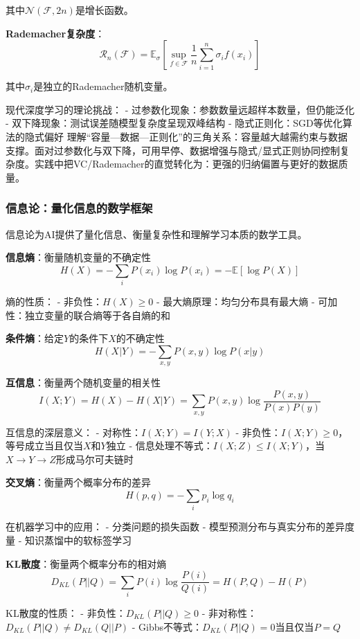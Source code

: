 其中$\mathcal{N}(\mathcal{F}, 2n)$是增长函数。

\textbf{Rademacher复杂度}：
$$\mathcal{R}_n(\mathcal{F}) = \mathbb{E}_{\sigma}\left[\sup_{f \in \mathcal{F}} \frac{1}{n}\sum_{i=1}^n \sigma_i f(x_i)\right]$$

其中$\sigma_i$是独立的Rademacher随机变量。

现代深度学习的理论挑战：
- 过参数化现象：参数数量远超样本数量，但仍能泛化
- 双下降现象：测试误差随模型复杂度呈现双峰结构
- 隐式正则化：SGD等优化算法的隐式偏好
理解“容量—数据—正则化”的三角关系：容量越大越需约束与数据支撑。面对过参数化与双下降，可用早停、数据增强与隐式/显式正则协同控制复杂度。实践中把VC/Rademacher的直觉转化为：更强的归纳偏置与更好的数据质量。

\subsubsection{信息论：量化信息的数学框架}

信息论为AI提供了量化信息、衡量复杂性和理解学习本质的数学工具。

\textbf{信息熵}：衡量随机变量的不确定性
$$H(X) = -\sum_{i} P(x_i) \log P(x_i) = -\mathbb{E}[\log P(X)]$$

熵的性质：
- 非负性：$H(X) \geq 0$
- 最大熵原理：均匀分布具有最大熵
- 可加性：独立变量的联合熵等于各自熵的和

\textbf{条件熵}：给定$Y$的条件下$X$的不确定性
$$H(X|Y) = -\sum_{x,y} P(x,y) \log P(x|y)$$

\textbf{互信息}：衡量两个随机变量的相关性
$$I(X;Y) = H(X) - H(X|Y) = \sum_{x,y} P(x,y) \log \frac{P(x,y)}{P(x)P(y)}$$

互信息的深层意义：
- 对称性：$I(X;Y) = I(Y;X)$
- 非负性：$I(X;Y) \geq 0$，等号成立当且仅当$X$和$Y$独立
- 信息处理不等式：$I(X;Z) \leq I(X;Y)$，当$X \to Y \to Z$形成马尔可夫链时

\textbf{交叉熵}：衡量两个概率分布的差异
$$H(p,q) = -\sum_{i} p_i \log q_i$$

在机器学习中的应用：
- 分类问题的损失函数
- 模型预测分布与真实分布的差异度量
- 知识蒸馏中的软标签学习

\textbf{KL散度}：衡量两个概率分布的相对熵
$$D_{KL}(P||Q) = \sum_{i} P(i) \log \frac{P(i)}{Q(i)} = H(P,Q) - H(P)$$

KL散度的性质：
- 非负性：$D_{KL}(P||Q) \geq 0$
- 非对称性：$D_{KL}(P||Q) \neq D_{KL}(Q||P)$
- Gibbs不等式：$D_{KL}(P||Q) = 0$当且仅当$P = Q$

